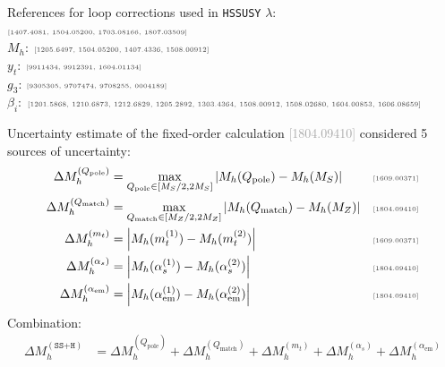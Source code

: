 \documentclass[hyperref={pdfpagelabels=false},ngerman]{beamer}
\newcommand{\MS}{\ensuremath{M_S}}
\newcommand{\mycite}[1]{\ensuremath{\text{\textcolor{darkgray}{\tiny [#1]}}}}
\newcommand{\bigcite}[1]{\textcolor{darkgray}{[#1]}}
\newcommand{\as}{\alpha_s}
\newcommand{\aem}{\alpha_\text{em}}
\newcommand{\Qpole}{\ensuremath{Q_\text{pole}}}
\newcommand{\Qmatch}{\ensuremath{Q_\text{match}}}
\newcommand{\DMh}{\ensuremath{\Delta M_h^{(\texttt{SS+H})}}}
\newcommand{\DMhQpole}{\ensuremath{\Delta M_h^{(\Qpole)}}}
\newcommand{\DMhQmatch}{\ensuremath{\Delta M_h^{(\Qmatch)}}}
\newcommand{\DMhMt}{\ensuremath{\Delta M_h^{(m_t)}}}
\newcommand{\DMhAlphaS}{\ensuremath{\Delta M_h^{(\as)}}}
\newcommand{\DMhAlphaEm}{\ensuremath{\Delta M_h^{(\aem)}}}
\def\HSSUSY{\texttt{HSSUSY}}
\begin{document}
\begin{frame}[noframenumbering]{References for loop corrections used in \HSSUSY}
  $\lambda$: \mycite{1407.4081, 1504.05200, 1703.08166, 1807.03509}\\
  $M_h$: \mycite{1205.6497, 1504.05200, 1407.4336, 1508.00912}\\
  $y_t$: \mycite{9911434, 9912391, 1604.01134}\\
  $g_3$: \mycite{9305305, 9707474, 9708255, 0004189}\\
  $\beta_i$: \mycite{1201.5868, 1210.6873, 1212.6829, 1205.2892, 1303.4364, 1508.00912, 1508.02680, 1604.00853, 1606.08659}
\end{frame}

\begin{frame}[noframenumbering]{Uncertainty estimate of the fixed-order calculation}
  \bigcite{1804.09410} considered 5 sources of uncertainty:
  \begin{align*}
    \DMhQpole &= \max_{\Qpole\in[\MS/2,2\MS]}\left|M_h(\Qpole) - M_h(\MS)\right| & \text{\mycite{1609.00371}} \\
    \DMhQmatch &= \max_{\Qmatch\in[M_Z/2,2M_Z]}\left|M_h(\Qmatch) - M_h(M_Z)\right| & \text{\mycite{1804.09410}} \\
    \DMhMt &= \left|M_h(m_t^{(1)}) - M_h(m_t^{(2)})\right| & \text{\mycite{1609.00371}} \\
    \DMhAlphaS &= \left| M_h(\as^{(1)}) - M_h(\as^{(2)}) \right| & \text{\mycite{1804.09410}} \\
    \DMhAlphaEm &= \left| M_h(\aem^{(1)}) - M_h(\aem^{(2)}) \right| & \text{\mycite{1804.09410}}
  \end{align*}
  Combination:
  \begin{align*}
    \DMh &= \DMhQpole + \DMhQmatch + \DMhMt + \DMhAlphaS + \DMhAlphaEm 
  \end{align*}
\end{frame}
\end{document}
